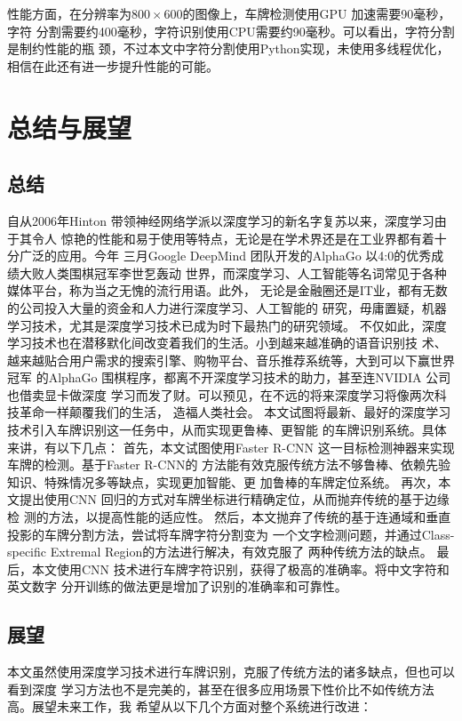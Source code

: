 性能方面，在分辨率为$800 \times 600$的图像上，车牌检测使用GPU 加速需要90毫秒，字符
分割需要约400毫秒，字符识别使用CPU需要约90毫秒。可以看出，字符分割是制约性能的瓶
颈，不过本文中字符分割使用Python实现，未使用多线程优化，相信在此还有进一步提升性能的可能。

\chapter{总结与展望}

\section{总结}

自从2006年Hinton 带领神经网络学派以深度学习的新名字复苏以来，深度学习由于其令人
惊艳的性能和易于使用等特点，无论是在学术界还是在工业界都有着十分广泛的应用。今年
三月Google DeepMind 团队开发的AlphaGo 以4:0的优秀成绩大败人类围棋冠军李世乭轰动
世界，而深度学习、人工智能等名词常见于各种媒体平台，称为当之无愧的流行用语。此外，
无论是金融圈还是IT业，都有无数的公司投入大量的资金和人力进行深度学习、人工智能的
研究，毋庸置疑，机器学习技术，尤其是深度学习技术已成为时下最热门的研究领域。
不仅如此，深度学习技术也在潜移默化间改变着我们的生活。小到越来越准确的语音识别技
术、越来越贴合用户需求的搜索引擎、购物平台、音乐推荐系统等，大到可以下赢世界冠军
的AlphaGo 围棋程序，都离不开深度学习技术的助力，甚至连NVIDIA 公司也借卖显卡做深度
学习而发了财。可以预见，在不远的将来深度学习将像两次科技革命一样颠覆我们的生活，
造福人类社会。
本文试图将最新、最好的深度学习技术引入车牌识别这一任务中，从而实现更鲁棒、更智能
的车牌识别系统。具体来讲，有以下几点：
首先，本文试图使用Faster R-CNN 这一目标检测神器来实现车牌的检测。基于Faster R-CNN的
方法能有效克服传统方法不够鲁棒、依赖先验知识、特殊情况多等缺点，实现更加智能、更
加鲁棒的车牌定位系统。
再次，本文提出使用CNN 回归的方式对车牌坐标进行精确定位，从而抛弃传统的基于边缘检
测的方法，以提高性能的适应性。
然后，本文抛弃了传统的基于连通域和垂直投影的车牌分割方法，尝试将车牌字符分割变为
一个文字检测问题，并通过Class-specific Extremal Region的方法进行解决，有效克服了
两种传统方法的缺点。
最后，本文使用CNN 技术进行车牌字符识别，获得了极高的准确率。将中文字符和英文数字
分开训练的做法更是增加了识别的准确率和可靠性。

\section{展望}

本文虽然使用深度学习技术进行车牌识别，克服了传统方法的诸多缺点，但也可以看到深度
学习方法也不是完美的，甚至在很多应用场景下性价比不如传统方法高。展望未来工作，我
希望从以下几个方面对整个系统进行改进：

